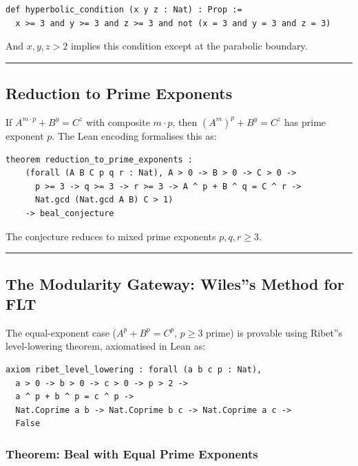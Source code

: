 \documentclass[12pt,a4paper]{article}
\begin{document}
\begin{lstlisting}[language=lean]
def hyperbolic_condition (x y z : Nat) : Prop :=
  x >= 3 and y >= 3 and z >= 3 and not (x = 3 and y = 3 and z = 3)
\end{lstlisting}

And $x, y, z > 2$ implies this condition except at the parabolic boundary.

\begin{center}
\rule{0.5\textwidth}{0.4pt}
\end{center}

\subsection{Reduction to Prime Exponents}

If $A^{m \cdot p} + B^y = C^z$ with composite $m \cdot p$, then $(A^m)^p + B^y = C^z$ has prime exponent $p$. The Lean encoding formalises this as:

\begin{lstlisting}[language=lean]
theorem reduction_to_prime_exponents :
    (forall (A B C p q r : Nat), A > 0 -> B > 0 -> C > 0 ->
      p >= 3 -> q >= 3 -> r >= 3 -> A ^ p + B ^ q = C ^ r ->
      Nat.gcd (Nat.gcd A B) C > 1)
    -> beal_conjecture
\end{lstlisting}

The conjecture reduces to mixed prime exponents $p, q, r \geq 3$.

\begin{center}
\rule{0.5\textwidth}{0.4pt}
\end{center}

\subsection{The Modularity Gateway: Wiles''s Method for FLT}

The equal-exponent case ($A^p + B^p = C^p$, $p \geq 3$ prime) is provable using Ribet''s level-lowering theorem, axiomatised in Lean as:

\begin{lstlisting}[language=lean]
axiom ribet_level_lowering : forall (a b c p : Nat),
  a > 0 -> b > 0 -> c > 0 -> p > 2 ->
  a ^ p + b ^ p = c ^ p ->
  Nat.Coprime a b -> Nat.Coprime b c -> Nat.Coprime a c ->
  False
\end{lstlisting}

\subsubsection{Theorem: Beal with Equal Prime Exponents}
\end{document}
